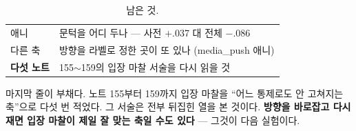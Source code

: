 \documentclass[10pt]{article}
\begin{document}

\begin{table}[t]
\centering\tsize
\caption{남은 것.}
\begin{tabular}{ll}
\toprule
애니 & 문턱을 어디 두나 --- 사전 $+$.037 대 전체 $-$.086 \\
다른 축 & 방향을 라벨로 정한 곳이 또 있나 (media\_push 애니) \\
\textbf{다섯 노트} & 155$\sim$159의 입장 마찰 서술을 다시 읽을 것 \\
\bottomrule
\end{tabular}
\end{table}

마지막 줄이 부채다. 노트 155부터 159까지 입장 마찰을 ``어느 통제로도 안
고쳐지는 축''으로 다섯 번 적었다. 그 서술은 전부 뒤집힌 열을 본 것이다.
\textbf{방향을 바로잡고 다시 재면 입장 마찰이 제일 잘 맞는 축일 수도 있다}
--- 그것이 다음 실험이다.
\end{document}
